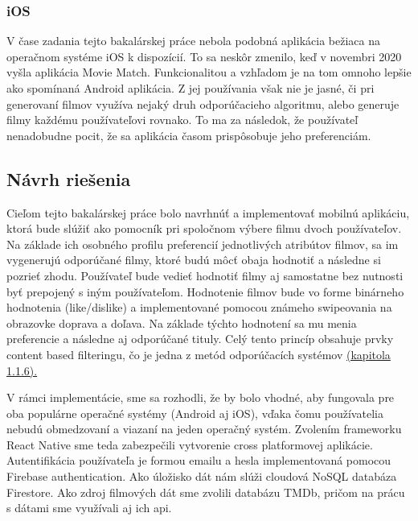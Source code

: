 \subsubsection{iOS}
V čase zadania tejto bakalárskej práce nebola podobná aplikácia bežiaca na operačnom systéme iOS k dispozícií. To sa neskôr zmenilo, keď v novembri 2020 vyšla aplikácia Movie Match. Funkcionalitou a vzhľadom je na tom omnoho lepšie ako spomínaná Android aplikácia. Z jej používania však nie je jasné, či pri generovaní filmov využíva nejaký druh odporúčacieho algoritmu, alebo generuje filmy každému používateľovi rovnako. To ma za následok, že  používateľ nenadobudne pocit, že sa aplikácia časom prispôsobuje jeho preferenciám. 


\subsection{Návrh riešenia}
Cieľom tejto bakalárskej práce bolo navrhnúť a implementovať mobilnú aplikáciu, ktorá bude slúžiť ako pomocník pri spoločnom výbere filmu dvoch používateľov. Na základe ich osobného profilu preferencií jednotlivých atribútov filmov, sa im vygenerujú odporúčané filmy, ktoré budú môcť obaja hodnotiť a následne si pozrieť zhodu. Používateľ bude vedieť hodnotiť filmy aj samostatne bez nutnosti byť prepojený s iným používateľom. Hodnotenie filmov bude vo forme binárneho hodnotenia (like/dislike) a implementované pomocou známeho swipeovania na obrazovke doprava a doľava. Na základe týchto hodnotení sa mu menia preferencie a následne aj odporúčané tituly. Celý tento princíp obsahuje prvky content based filteringu, čo je jedna z metód odporúčacích systémov \hyperref[sec:contentbased]{(kapitola 1.1.6).}

V rámci implementácie, sme sa rozhodli, že by bolo vhodné, aby fungovala pre oba populárne operačné systémy (Android aj iOS), vďaka čomu používatelia nebudú obmedzovaní a viazaní na jeden operačný systém. Zvolením frameworku React Native sme teda zabezpečili vytvorenie cross platformovej aplikácie. Autentifikácia používateľa je formou emailu a hesla implementovaná pomocou Firebase authentication. Ako úložisko dát nám slúži cloudová NoSQL databáza Firestore. Ako zdroj filmových dát sme zvolili databázu TMDb, pričom na prácu s dátami sme využívali aj ich \acrshort{api}. 
\vspace{55mm} %


